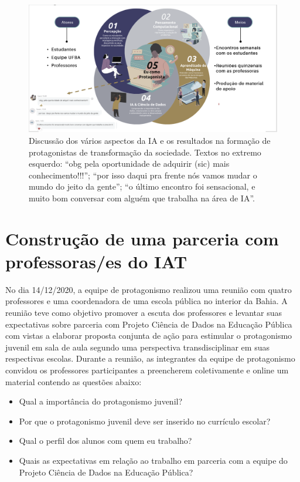 \documentclass[
]{book}
\providecommand{\tightlist}{%
  \setlength{\itemsep}{0pt}\setlength{\parskip}{0pt}}
\begin{document}
\begin{figure}
\includegraphics[width=18.42in]{images/image123} \caption{Discussão dos vários aspectos da IA e os resultados na formação de protagonistas de transformação da sociedade. Textos no extremo esquerdo: “obg pela oportunidade de adquirir (sic) mais conhecimento!!!”; “por isso daqui pra frente nós vamos mudar o mundo do jeito da gente”; “o último encontro foi sensacional, e muito bom conversar com alguém que trabalha na área de IA”.}\label{fig:diagramaAI}
\end{figure}

\hypertarget{construuxe7uxe3o-de-uma-parceria-com-professorases-do-iat}{%
\section{Construção de uma parceria com professoras/es do IAT}\label{construuxe7uxe3o-de-uma-parceria-com-professorases-do-iat}}

No dia 14/12/2020, a equipe de protagonismo realizou uma reunião com quatro professores e uma coordenadora de uma escola pública no interior da Bahia. A reunião teve como objetivo promover a escuta dos professores e levantar suas expectativas sobre parceria com Projeto Ciência de Dados na Educação Pública com vistas a elaborar proposta conjunta de ação para estimular o protagonismo juvenil em sala de aula segundo uma perspectiva transdisciplinar em suas respectivas escolas.
Durante a reunião, as integrantes da equipe de protagonismo convidou os professores participantes a preencherem coletivamente e online um material contendo as questões abaixo:

\begin{itemize}
\tightlist
\item
  Qual a importância do protagonismo juvenil?
\item
  Por que o protagonismo juvenil deve ser inserido no currículo escolar?
\item
  Qual o perfil dos alunos com quem eu trabalho?
\item
  Quais as expectativas em relação ao trabalho em parceria com a equipe do Projeto Ciência de Dados na Educação Pública?
\end{itemize}
\end{document}
